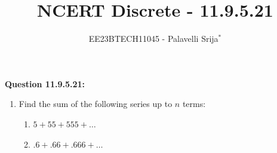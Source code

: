 \documentclass[journal,12pt,twocolumn]{IEEEtran}
\theoremstyle{remark}
\begin{document}


\title{NCERT Discrete - 11.9.5.21}
\author{EE23BTECH11045 - Palavelli Srija$^{*}$}

\maketitle

\newpage
\bigskip

\renewcommand{\thefigure}{\theenumi}
\renewcommand{\thetable}{\theenumi}

\vspace{3cm}
\textbf{Question 11.9.5.21:} 
\begin{enumerate}
  \item Find the sum of the following series up to $n$ terms:
  \begin{enumerate}
    \item $5 + 55 + 555 + \ldots$
    \item $.6 + .66 + .666 + \ldots$
  \end{enumerate}
\end{enumerate}
\end{document}
